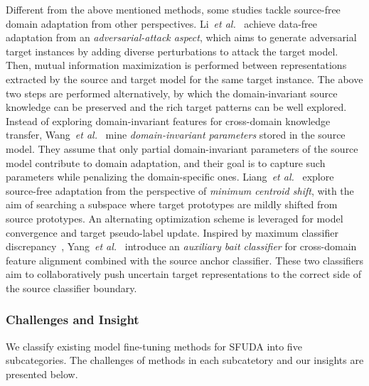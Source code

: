 \documentclass[10pt,journal,compsoc]{IEEEtran}
\def\etal{{\em et al.}}
\def\ie{{\em i.e.}}
\begin{document}
Different from the above mentioned methods, some studies tackle source-free domain adaptation from other perspectives.
Li~\etal~\cite{li2021divergence} achieve data-free adaptation from an \emph{adversarial-attack aspect}, which aims to generate adversarial target instances by adding diverse perturbations to attack the target model.
Then, mutual information maximization is performed between representations extracted by the source and target model for the same target instance.
The above two steps are performed alternatively, by which the domain-invariant source knowledge can be preserved and the rich target patterns can be well explored.
Instead of exploring domain-invariant features for cross-domain knowledge transfer, Wang~\etal~\cite{wang2022exploring} mine \emph{domain-invariant parameters} stored in the source model.
They assume that only partial domain-invariant parameters of the source model contribute to domain adaptation, and their goal is to capture such parameters while penalizing the domain-specific ones.
Liang~\etal~\cite{liang2019distant} explore source-free adaptation from the perspective of \emph{minimum centroid shift}, with the aim of searching a subspace where target prototypes are mildly shifted from source prototypes.
An alternating optimization scheme is leveraged for model convergence and target pseudo-label update.
Inspired by maximum classifier discrepancy~\cite{saito2018maximum}, Yang~\etal~\cite{yang2020casting} introduce an \emph{auxiliary bait classifier} for cross-domain feature alignment combined with the source anchor classifier.
These two classifiers aim to collaboratively push uncertain target representations to the correct side of the source classifier boundary.


\subsubsection{Challenges and Insight}
We classify existing model fine-tuning methods for SFUDA into five subcategories. %
The challenges of methods in each subcatetory and our insights are presented below. 
\end{document}
